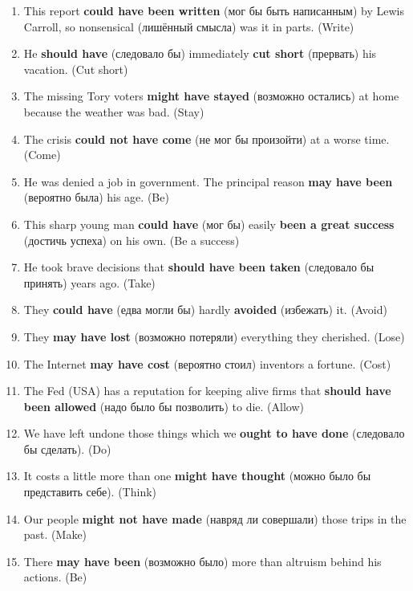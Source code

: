 \documentclass[main.tex]{subfiles}
\begin{document}
\newpage
\setcounter{subsection}{4}


\begin{enumerate}[nosep,leftmargin=*]
	\itemsep\eitsp
	\item This report \textbf{could have been written} (мог бы быть написанным) by Lewis Carroll, so nonsensical (лишённый смысла) was it in parts. (Write)
	\item He \textbf{should have} (следовало бы) immediately \textbf{cut short} (прервать) his vacation. (Cut short)
	\item The missing Tory voters \textbf{might have stayed} (возможно остались) at home because the weather was bad. (Stay)
	\item The crisis \textbf{could not have come} (не мог бы произойти) at a worse time. (Come)
	\item He was denied a job in government. The principal reason \textbf{may have been} (вероятно была) his age. (Be)
	\item This sharp young man \textbf{could have} (мог бы) easily \textbf{been a great success} (достичь успеха) on his own. (Be a success)
	\item He took brave decisions that \textbf{should have been taken} (следовало бы принять) years ago. (Take)
	\item They \textbf{could have} (едва могли бы) hardly \textbf{avoided} (избежать) it. (Avoid)
	\item They \textbf{may have lost} (возможно потеряли) everything they cherished. (Lose)
	\item The Internet \textbf{may have cost} (вероятно стоил) inventors a fortune. (Cost)
	\item The Fed (USA) has a reputation for keeping alive firms that \textbf{should have been allowed} (надо было бы позволить) to die. (Allow)
	\item We have left undone those things which we \textbf{ought to have done} (следовало бы сделать). (Do)
	\item It costs a little more than one \textbf{might have thought} (можно было бы представить себе). (Think)
	\item Our people \textbf{might not have made} (навряд ли совершали) those trips in the past. (Make)
	\item There \textbf{may have been} (возможно было) more than altruism behind his actions. (Be)
\end{enumerate}
\end{document}
